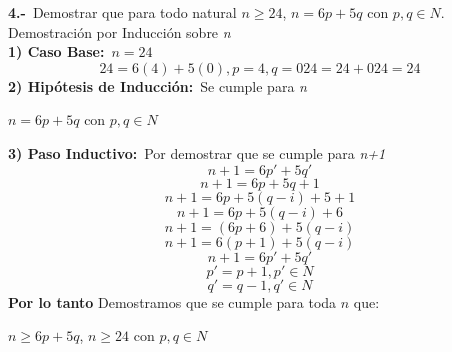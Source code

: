 \textbf{4.-}\ Demostrar que para todo natural $n \geq 24$, $n = 6p +5q$ con $p,q \in N$.\\
\newline
Demostración por Inducción sobre \textit{n}\\
\newline
\textbf{1) Caso Base:}\ $n = 24$
\[
24 = 6(4) + 5(0), p=4, q=0
24 = 24 + 0
24 = 24
\]
\textbf{2) Hipótesis de Inducción:}\  Se cumple para \textit{n}\
\begin{center}
$n = 6p +5q$ con $p,q \in N$
\end{center}
\textbf{3) Paso Inductivo:}\  Por demostrar que se cumple para \textit{n+1}\
\[
n+1 = 6p' + 5q'
\]
\[
n+1 = 6p + 5q +1
\]
\[
n+1 = 6p + 5(q-i) +5 +1
\]
\[
n+1 = 6p + 5(q-i) +6
\]
\[
n+1 = (6p + 6) + 5(q-i) 
\]
\[
n+1 = 6(p+1) + 5(q-i) 
\]
\[
n+1 = 6p' + 5q'
\]
\[
p' = p+1 ,  p' \in N
\]
\[
q' = q-1 ,  q' \in N
\]
\textbf{Por lo tanto} Demostramos que se cumple para toda $n$ que:
\begin{center}
$n \geq 6p +5q $, $n \geq 24$  con $ p,q \in N$
\end{center}

